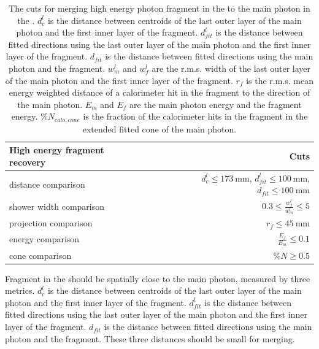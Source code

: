 \begin{table}[htbp]
\centering

\smallskip

\begin{tabular}{l r }
\hline
\hline
High energy fragment recovery&  Cuts\\
\hline
\multicolumn{1}{L{0.3\textwidth}}{distance comparison} & \multicolumn{1}{R{0.3\textwidth}}{$d^l_c \leqslant 173\ \text{mm}$, $d^l_{fit} \leqslant 100\ \text{mm}$, $d_{fit} \leqslant 100\ \text{mm}$} \\
\multicolumn{1}{L{0.3\textwidth}}{shower width comparison} & \multicolumn{1}{R{0.3\textwidth}}{$  0.3 \leqslant \frac{w^l_f}{w^l_m} \leqslant 5$} \\
\multicolumn{1}{L{0.3\textwidth}}{projection comparison} & \multicolumn{1}{R{0.3\textwidth}}{$ r_f \leqslant 45\ \text{mm}$} \\
\multicolumn{1}{L{0.3\textwidth}}{energy comparison} & \multicolumn{1}{R{0.3\textwidth}}{$ \frac{E_f}{E_m} \leqslant 0.1$} \\
\multicolumn{1}{L{0.3\textwidth}}{cone comparison} & \multicolumn{1}{R{0.3\textwidth}}{$ \%{N} \geqslant 0.5$} \\
\hline

\hline
\end{tabular}

\caption[Cuts for merging high energy photon fragment in the \HCAL.]%
{The cuts for merging high energy photon fragment in the \HCAL to the main photon in the \ECAL. $d^l_c$ is the distance between centroids of the last outer layer of the main photon and the first inner layer of the fragment. $d^l_{fit}$ is the distance between fitted directions using the last outer layer of the main photon and the first inner layer of the fragment. $d_{fit}$ is the distance between fitted directions using the main photon and the fragment. $w^l_m$ and $w^l_f$ are the r.m.s. width of the last outer layer of the main photon and the first inner layer of the fragment. $r_f$ is the r.m.s. mean energy weighted distance of a calorimeter hit in the fragment to the direction of the main photon. $E_m$ and $E_f$ are the main photon energy and the fragment energy. $\%{N_{calo,cone}}$ is the fraction of the calorimeter hits in the fragment in the extended fitted cone of the main photon.}
\label{tab:photonHighEnergyFragCuts}
\end{table}

Fragment in the \HCAL should be spatially close to the main photon, measured by three metrics. $d^l_c$ is the distance between centroids of the last outer layer of the main photon and the first inner layer of the fragment. $d^l_{fit}$ is the distance between fitted directions using the last outer layer of the main photon and the first inner layer of the fragment. $d_{fit}$ is the distance between fitted directions using the main photon and the fragment. These three distances should be small for merging.

